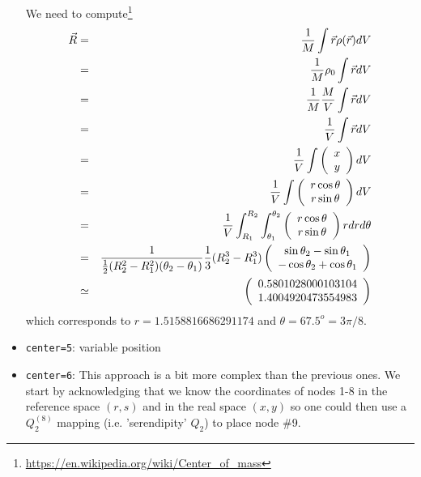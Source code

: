 \begin{itemize}
We need to compute\footnote{\url{https://en.wikipedia.org/wiki/Center_of_mass}}
\begin{eqnarray}
\vec{R} 
&=&\frac{1}{M} \int \vec{r} \rho(\vec r) dV \nonumber\\
&=&\frac{1}{M} \rho_0 \int \vec{r} dV\nonumber\\
&=&\frac{1}{M} \frac{M}{V} \int \vec{r} dV\nonumber\\
&=&\frac{1}{V} \int \vec{r} dV\nonumber\\
&=&\frac{1}{V} \int \left(\begin{array}{c} x \\ y \end{array}\right)  dV\nonumber\\
&=&\frac{1}{V} \int \left(\begin{array}{c} r \cos \theta \\ r \sin\theta \end{array}\right)dV\nonumber\\
&=&\frac{1}{V} \int_{R_1}^{R_2} \int_{\theta_1}^{\theta_2} \left(\begin{array}{c} r \cos \theta 
\\ r \sin\theta \end{array}\right)  r dr d\theta\nonumber\\
&=&\frac{1}{\frac12 (R_2^2-R_1^2) (\theta_2-\theta_1)} \frac13(R_2^3-R_1^3) 
\left(
\begin{array}{c}
\sin\theta_2-\sin\theta_1 \\
-\cos\theta_2+\cos\theta_1 
\end{array}
\right) \nonumber\\
&\simeq& 
\left(
\begin{array}{c}
0.5801028000103104\\
1.4004920473554983
\end{array}
\right) 
\end{eqnarray}
which corresponds to $r=1.5158816686291174$ and $\theta=67.5^o=3\pi/8$.

\item \lstinline{center=5}: variable position

\item \lstinline{center=6}: This approach is a bit more complex than the previous ones.
We start by acknowledging that we know the coordinates of nodes 1-8 in the reference space $(r,s)$ 
and in the real space $(x,y)$ so one could then use a $Q_2^{(8)}$ mapping (i.e. 'serendipity' $Q_2$)
to place node \#9.


\end{itemize}
